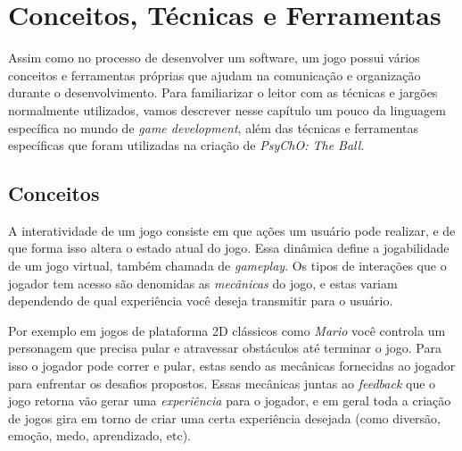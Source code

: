 



\chapter{Conceitos, Técnicas e Ferramentas}
\label{cap:conceitos_tecnicas_e_ferramentas}

Assim como no processo de desenvolver um software, um jogo possui vários conceitos e ferramentas próprias que ajudam na comunicação e organização durante o desenvolvimento.
Para familiarizar o leitor com as técnicas e jargões normalmente utilizados, vamos descrever nesse capítulo um pouco da linguagem específica no mundo de \textit{game development}, além das técnicas e ferramentas específicas que foram utilizadas na criação de \textit{PsyChO: The Ball}.

\section{Conceitos}
\label{sec:conceitos}
  A interatividade de um jogo consiste em que ações um usuário pode realizar, e de que forma isso altera o estado atual do jogo. Essa dinâmica define a jogabilidade de um jogo virtual, também chamada de \textit{gameplay}. Os tipos de interações que o jogador tem acesso são denomidas as \textit{mecânicas} do jogo, e estas variam dependendo de qual experiência você deseja transmitir para o usuário.

  Por exemplo em jogos de plataforma 2D clássicos como \textit{Mario} você controla um personagem que precisa pular e atravessar obstáculos até terminar o jogo. Para isso o jogador pode correr e pular, estas sendo as mecânicas fornecidas ao jogador para enfrentar os desafios propostos. Essas mecânicas juntas ao \textit{feedback} que o jogo retorna vão gerar uma \textit{experiência} para o jogador, e em geral toda a criação de jogos gira em torno de criar uma certa experiência desejada (como diversão, emoção, medo, aprendizado, etc).

